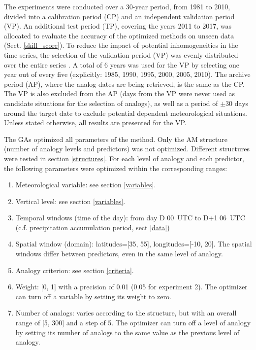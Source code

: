 \documentclass[draft]{agujournal2019}
\begin{document}
The experiments were conducted over a 30-year period, from 1981 to 2010, divided into a calibration period (CP) and an independent validation period (VP). An additional test period (TP), covering the years 2011 to 2017, was allocated to evaluate the accuracy of the optimized methods on unseen data (Sect. \ref{skill_score}). To reduce the impact of potential inhomogeneities in the time series, the selection of the validation period (VP) was evenly distributed over the entire series \cite<as in>[]{BenDaoud2010}. A total of 6 years was used for the VP by selecting one year out of every five (explicitly: 1985, 1990, 1995, 2000, 2005, 2010). The archive period (AP), where the analog dates are being retrieved, is the same as the CP. The VP is also excluded from the AP (days from the VP were never used as candidate situations for the selection of analogs), as well as a period of $\pm30$ days around the target date to exclude potential dependent meteorological situations. Unless stated otherwise, all results are presented for the VP.

The GAs optimized all parameters of the method. Only the AM structure (number of analogy levels and predictors) was not optimized. Different structures were tested in section \ref{structures}. For each level of analogy and each predictor, the following parameters were optimized within the corresponding ranges:

\begin{enumerate}		
	\item Meteorological variable: see section \ref{variables}.
	\item Vertical level: see section \ref{variables}.
	\item Temporal windows (time of the day): from day D 00~UTC to D+1 06~UTC (c.f. precipitation accumulation period, sect \ref{data})
	\item Spatial window (domain): latitudes=[35, 55], longitudes=[-10, 20]. The spatial windows differ between predictors, even in the same level of analogy.
	\item Analogy criterion: see section \ref{criteria}.
	\item Weight: [0, 1] with a precision of 0.01 (0.05 for experiment 2). The optimizer can turn off a variable by setting its weight to zero.
	\item Number of analogs: varies according to the structure, but with an overall range of [5, 300] and a step of 5. The optimizer can turn off a level of analogy by setting its number of analogs to the same value as the previous level of analogy.
\end{enumerate}
\end{document}
